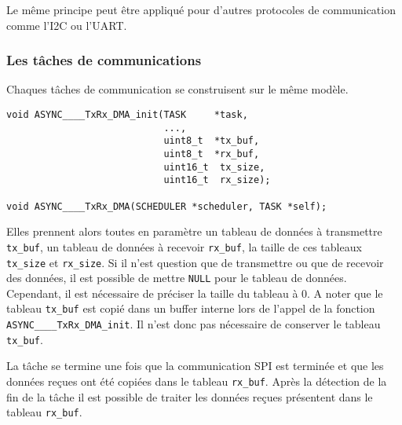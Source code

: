 Le même principe peut être appliqué pour d'autres protocoles de communication
comme l'I2C ou l'UART.

\subsubsection{Les tâches de communications}

Chaques tâches de communication se construisent sur le même modèle.

\begin{lstlisting}[style=prog, frame=shadowbox, caption={Patron d'une tâche de communication}, label={lst:async_pattern_comm},
    emph={[1]ASYNC____TxRx_DMA_init, ASYNC____TxRx_DMA}, emphstyle={[1]\color{C}},
    emph={[2]SCHEDULER, TASK, ASYNC_DMA_STATE, ASYNC_SPI_TxRx_DMA_CONTEXT}, emphstyle={[2]\color{E}}]
void ASYNC____TxRx_DMA_init(TASK     *task,
                            ...,
                            uint8_t  *tx_buf,
                            uint8_t  *rx_buf,
                            uint16_t  tx_size,
                            uint16_t  rx_size);

void ASYNC____TxRx_DMA(SCHEDULER *scheduler, TASK *self);
\end{lstlisting}

Elles prennent alors toutes en paramètre un tableau de données à transmettre
\texttt{tx\_buf}, un tableau de données à recevoir \texttt{rx\_buf}, la taille de ces
tableaux \texttt{tx\_size} et \texttt{rx\_size}. Si il n'est question que de
transmettre ou que de recevoir des données, il est possible de mettre \texttt{NULL}
pour le tableau de données. Cependant, il est nécessaire de préciser la taille du
tableau à 0. A noter que le tableau \texttt{tx\_buf} est copié dans un buffer interne
lors de l'appel de la fonction \texttt{ASYNC\_\_\_\_TxRx\_DMA\_init}. Il n'est donc
pas nécessaire de conserver le tableau \texttt{tx\_buf}.

La tâche se termine une fois que la communication SPI est terminée et que les données
reçues ont été copiées dans le tableau \texttt{rx\_buf}. Après la détection de la fin
de la tâche il est possible de traiter les données reçues présentent dans le tableau
\texttt{rx\_buf}.
